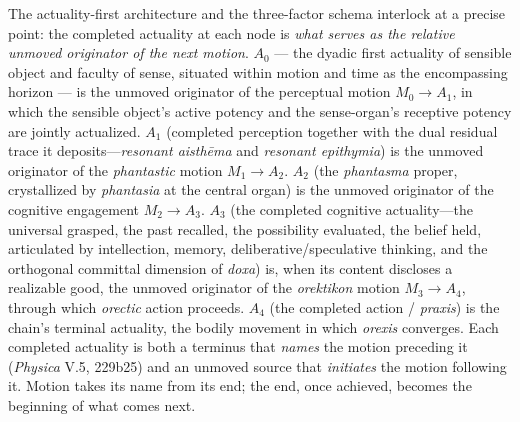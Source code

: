 \documentclass{article}
\begin{document}
The actuality-first architecture and the three-factor schema interlock at a precise point: the completed actuality at each node is \textit{what serves as the relative unmoved originator of the next motion}. $A_0$ --- the dyadic first actuality of sensible object and faculty of sense, situated within motion and time as the encompassing horizon --- is the unmoved originator of the perceptual motion $M_0 \rightarrow A_1$, in which the sensible object's active potency and the sense-organ's receptive potency are jointly actualized. $A_1$ (completed perception together with the dual residual trace it deposits---\textit{resonant aisthēma} and \textit{resonant epithymia}) is the unmoved originator of the \textit{phantastic} motion $M_1 \rightarrow A_2$. $A_2$ (the \textit{phantasma} proper, crystallized by \textit{phantasia} at the central organ) is the unmoved originator of the cognitive engagement $M_2 \rightarrow A_3$. $A_3$ (the completed cognitive actuality---the universal grasped, the past recalled, the possibility evaluated, the belief held, articulated by intellection, memory, deliberative/speculative thinking, and the orthogonal committal dimension of \textit{doxa}) is, when its content discloses a realizable good, the unmoved originator of the \textit{orektikon} motion $M_3 \rightarrow A_4$, through which \textit{orectic} action proceeds. $A_4$ (the completed action / \textit{praxis}) is the chain's terminal actuality, the bodily movement in which \textit{orexis} converges. Each completed actuality is both a terminus that \textit{names} the motion preceding it (\textit{Physica} V.5, 229b25) and an unmoved source that \textit{initiates} the motion following it. Motion takes its name from its end; the end, once achieved, becomes the beginning of what comes next. 
\end{document}
